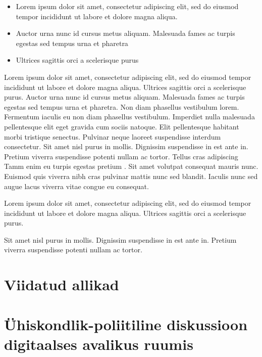 \documentclass[]{book}
\begin{document}
\begin{points}
\begin{itemize}
\item
  Lorem ipsum dolor sit amet, consectetur adipiscing elit, sed do
  eiusmod tempor incididunt ut labore et dolore magna aliqua.
\item
  Auctor urna nunc id cursus metus aliquam. Malesuada fames ac turpis
  egestas sed tempus urna et pharetra
\item
  Ultrices sagittis orci a scelerisque purus
\end{itemize}
\end{points}

Lorem ipsum dolor sit amet, consectetur adipiscing elit, sed do eiusmod tempor incididunt ut labore et dolore magna aliqua. Ultrices sagittis orci a scelerisque purus. Auctor urna nunc id cursus metus aliquam. Malesuada fames ac turpis egestas sed tempus urna et pharetra. Non diam phasellus vestibulum lorem. Fermentum iaculis eu non diam phasellus vestibulum. Imperdiet nulla malesuada pellentesque elit eget gravida cum sociis natoque. Elit pellentesque habitant morbi tristique senectus. Pulvinar neque laoreet suspendisse interdum consectetur. Sit amet nisl purus in mollis. Dignissim suspendisse in est ante in. Pretium viverra suspendisse potenti nullam ac tortor. Tellus cras adipiscing Tamm \autocite*[lk 10]{tamm2018} enim eu turpis \autocite[lk 10]{parn2011} egestas pretium \autocites[lk 1]{kask2017}[lk 2]{kask2016}. Sit amet \autocite{kuusk2017} volutpat consequat \autocite{parn2011} mauris nunc. Euismod quis \autocites{tamm2018}{kuusk2017}{parn2011} viverra nibh cras pulvinar \autocite{kirss2014} mattis nunc sed blandit. Iaculis nunc sed augue lacus viverra vitae congue eu consequat.

\begin{blockquote}
Lorem ipsum dolor sit amet, consectetur adipiscing elit, sed do eiusmod
tempor incididunt ut labore et dolore magna aliqua. Ultrices sagittis
orci a scelerisque purus.
\end{blockquote}

Sit amet nisl purus in mollis. Dignissim suspendisse in est ante in. Pretium viverra suspendisse potenti nullam ac tortor.

\hypertarget{viidatud-allikad}{%
\section{Viidatud allikad}\label{viidatud-allikad}}

\hypertarget{chapter12}{%
\section{Ühiskondlik-poliitiline diskussioon digitaalses avalikus ruumis}\label{chapter12}}
\end{document}
